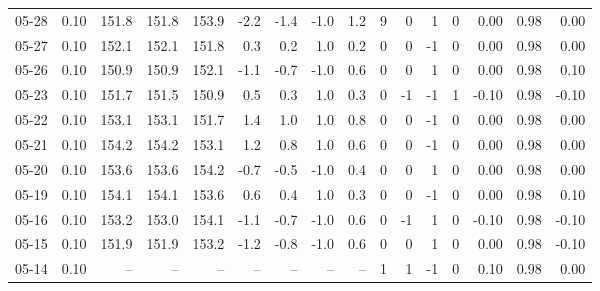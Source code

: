 \begin{threeparttable}
{\begin{tabular}{lrrrrrrrrrrrrrrr}
  05-28 &     0.10 & 151.8 & 151.8 & 153.9 &       -2.2 &           -1.4 &                     -1.0 &                 1.2 &              9 &         0 &     1 &         0 &       0.00 &      0.98 &           0.00 \\
  05-27 &     0.10 & 152.1 & 152.1 & 151.8 &        0.3 &            0.2 &                      1.0 &                 0.2 &              0 &         0 &    -1 &         0 &       0.00 &      0.98 &           0.00 \\
  05-26 &     0.10 & 150.9 & 150.9 & 152.1 &       -1.1 &           -0.7 &                     -1.0 &                 0.6 &              0 &         0 &     1 &         0 &       0.00 &      0.98 &           0.10 \\
  05-23 &     0.10 & 151.7 & 151.5 & 150.9 &        0.5 &            0.3 &                      1.0 &                 0.3 &              0 &        -1 &    -1 &         1 &      -0.10 &      0.98 &          -0.10 \\
  05-22 &     0.10 & 153.1 & 153.1 & 151.7 &        1.4 &            1.0 &                      1.0 &                 0.8 &              0 &         0 &    -1 &         0 &       0.00 &      0.98 &           0.00 \\
  05-21 &     0.10 & 154.2 & 154.2 & 153.1 &        1.2 &            0.8 &                      1.0 &                 0.6 &              0 &         0 &    -1 &         0 &       0.00 &      0.98 &           0.00 \\
  05-20 &     0.10 & 153.6 & 153.6 & 154.2 &       -0.7 &           -0.5 &                     -1.0 &                 0.4 &              0 &         0 &     1 &         0 &       0.00 &      0.98 &           0.00 \\
  05-19 &     0.10 & 154.1 & 154.1 & 153.6 &        0.6 &            0.4 &                      1.0 &                 0.3 &              0 &         0 &    -1 &         0 &       0.00 &      0.98 &           0.10 \\
  05-16 &     0.10 & 153.2 & 153.0 & 154.1 &       -1.1 &           -0.7 &                     -1.0 &                 0.6 &              0 &        -1 &     1 &         0 &      -0.10 &      0.98 &          -0.10 \\
  05-15 &     0.10 & 151.9 & 151.9 & 153.2 &       -1.2 &           -0.8 &                     -1.0 &                 0.6 &              0 &         0 &     1 &         0 &       0.00 &      0.98 &          -0.10 \\
  05-14 &     0.10 &    -- &    -- &    -- &         -- &             -- &                       -- &                  -- &              1 &         1 &    -1 &         0 &       0.10 &      0.98 &           0.00 \\

\end{tabular}}
\end{threeparttable}
